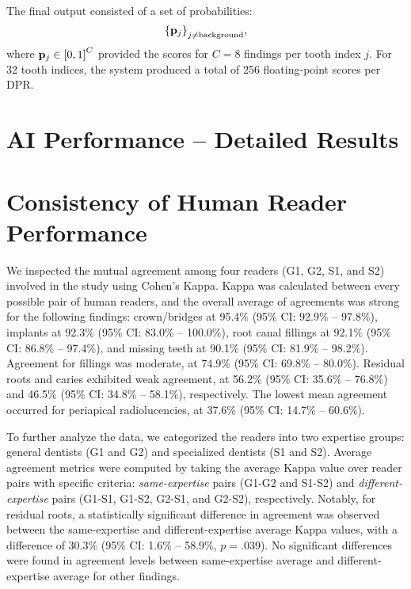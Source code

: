The final output consisted of a set of probabilities:
\begin{equation}
    {\left\{\mathbf{p}_j\right\}}_{j\neq\text{background}},
\end{equation}
where $\mathbf{p}_j \in {\left[0, 1\right]}^C$ provided the scores for $C = 8$ findings per tooth index $j$.
For 32 tooth indices, the system produced a total of 256 floating-point scores per DPR.

\newpage

\section{AI Performance -- Detailed Results}
\label{sec:performance-comparison-detailed}


\newpage

\section{Consistency of Human Reader Performance}
\label{sec:consistency-of-human}


We inspected the mutual agreement among four readers (G1, G2, S1, and S2) involved in the study using Cohen's Kappa.
Kappa was calculated between every possible pair of human readers, and the overall average of agreements was strong~\citep{mchugh2012interrater} for the following findings: crown/bridges at 95.4\% (95\% CI: 92.9\% -- 97.8\%), implants at 92.3\% (95\% CI: 83.0\% -- 100.0\%), root canal fillings at 92.1\% (95\% CI: 86.8\% -- 97.4\%), and missing teeth at 90.1\% (95\% CI: 81.9\% -- 98.2\%).
Agreement for fillings was moderate, at 74.9\% (95\% CI: 69.8\% -- 80.0\%).
Residual roots and caries exhibited weak agreement, at 56.2\% (95\% CI: 35.6\% -- 76.8\%) and 46.5\% (95\% CI: 34.8\% -- 58.1\%), respectively.
The lowest mean agreement occurred for periapical radiolucencies, at 37.6\% (95\% CI: 14.7\% -- 60.6\%).

To further analyze the data, we categorized the readers into two expertise groups: general dentists (G1 and G2) and specialized dentists (S1 and S2).
Average agreement metrics were computed by taking the average Kappa value over reader pairs with specific criteria: \emph{same-expertise} pairs (G1-G2 and S1-S2) and \emph{different-expertise} pairs (G1-S1, G1-S2, G2-S1, and G2-S2), respectively.
Notably, for residual roots, a statistically significant difference in agreement was observed between the same-expertise and different-expertise average Kappa values, with a difference of 30.3\% (95\% CI: 1.6\% -- 58.9\%, $p = .039$).
No significant differences were found in agreement levels between same-expertise average and different-expertise average for other findings.